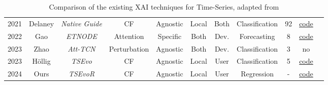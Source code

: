 \begin{table*}[h!]
\begin{tabular}{@{}ccccccccccc@{}}
    2021        & Delaney\cite{delaney_instance-based_2021} & \textit{\footnotesize{Native Guide}} & CF & Agnostic & Local & Both      & Classification & 92 & \href{https://github.com/e-delaney/Instance-Based_CFE_TSC/tree/main}{code} \\
  
    2022        &Gao\cite{gao_explainable_2022}       &  \textit{ETNODE}  & Attention     &Specific       & Both          & Dev.      & Forecasting                        & 8                 & \href{https://github.com/PengleiGao/ETN-ODE}{code} \\  

    2023        &Zhao\cite{zhao_explainable_2023}                &\textit{Att-TCN}   & Perturbation             & Agnostic             & Both             & Dev.          & Classification                    & 3                 & no \\ 

    2023        & Höllig\cite{hollig_tsevo_2022}           & \textit{TSEvo}& CF           & Agnostic             & Local             & User         & Classification                                 & 5                 & \href{https://github.com/fzi-forschungszentrum-informatik/TSInterpret}{code} \\

    2024        & Ours           & \textit{TSEvoR}& CF           & Agnostic             & Local             & User         & Regression                   & -                 & \href{https://github.com/AlexisTabin/BA-Estimation-TCN}{code} \\

    \bottomrule
  \end{tabular}
  \caption{Comparison of the existing XAI techniques for Time-Series, adapted from \cite{rojat_explainable_2021}}
\end{table*}